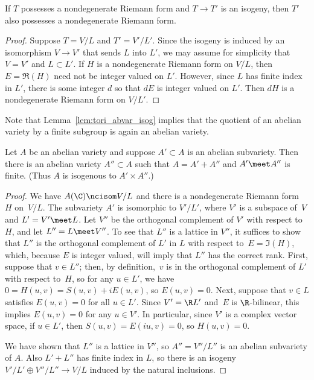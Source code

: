 \documentclass{report}
\begin{document}
\begin{lemma}\label{lem:tori_abvar_isog}
If $T$ possesses a nondegenerate Riemann form and $T\to T'$ is an
isogeny, then $T'$ also possesses a nondegenerate Riemann form.
\end{lemma}
\begin{proof}
Suppose $T=V/L$ and $T'=V'/L'$.  Since the isogeny is induced by
an isomorphism $V\to V'$ that sends $L$ into $L'$, we may assume
for simplicity that $V=V'$ and $L\subset L'$.  If $H$ is a
nondegenerate Riemann form on $V/L$, then $E=\Re(H)$ need not be
integer valued on $L'$.  However, since $L$ has finite index in
$L'$, there is some integer $d$ so that $dE$ is integer valued on
$L'$.  Then $dH$ is a nondegenerate Riemann form on $V/L'$.
\end{proof}
Note that Lemma~\ref{lem:tori_abvar_isog} implies that the
quotient of an abelian variety by a finite subgroup is again an
abelian variety.

\begin{theorem}\label{thm:poincare_reducibility}%
Let $A$ be an abelian variety and suppose $A'\subset A$ is an
abelian subvariety.  Then there is an abelian variety $A''\subset
A$ such that $A=A'+A''$ and $A'\meet A''$ is finite.  (Thus $A$ is
isogenous to $A'\times A''$.)
\end{theorem}
\begin{proof}
We have $A(\C)\ncisom V/L$ and there is a nondegenerate Riemann
form~$H$ on~$V/L$.  The subvariety $A'$ is isomorphic to $V'/L'$,
where $V'$ is a subspace of~$V$ and $L'=V'\meet L$. Let $V''$ be
the orthogonal complement of $V'$ with respect to $H$, and let
$L''=L\meet V''$.  To see that $L''$ is a lattice in $V''$, it
suffices to show that $L''$ is the orthogonal complement of $L'$
in $L$ with respect to~$E=\Im(H)$, which, because $E$ is integer
valued, will imply that $L''$ has the correct rank.  First,
suppose that $v\in L''$; then, by definition,~$v$ is in the
orthogonal complement of $L'$ with respect to~$H$, so for any
$u\in L'$, we have $0=H(u,v)=S(u,v)+i E(u,v)$, so $E(u,v)=0$.
Next, suppose that $v\in L$ satisfies $E(u,v)=0$ for all $u\in
L'$.  Since $V'=\R L'$ and~$E$ is $\R$-bilinear, this implies
$E(u,v)=0$ for any $u\in V'$.  In particular, since $V'$ is a
complex vector space, if $u\in L'$, then $S(u,v) = E(iu,v)=0$, so
$H(u,v)=0$.

We have shown that $L''$ is a lattice in $V''$, so $A''=V''/L''$
is an abelian subvariety of $A$.  Also $L'+L''$ has finite index
in $L$, so there is an isogeny $V'/L' \oplus V''/L'' \to V/L$
induced by the natural inclusions.
\end{proof}
\end{document}
